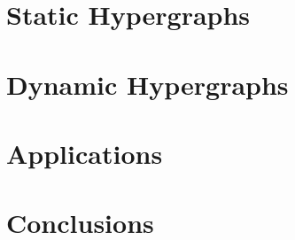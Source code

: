 \documentclass[10pt]{article}
\begin{document}
\section{Static Hypergraphs}

\section{Dynamic Hypergraphs}

\section{Applications}

\section{Conclusions}



\end{document}
